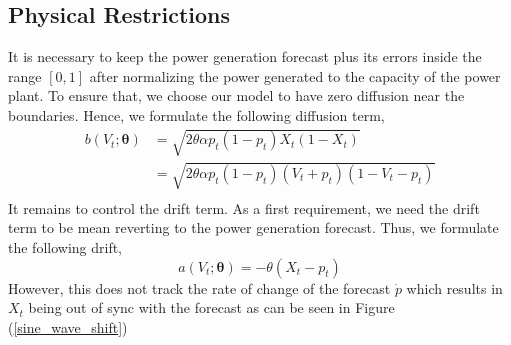 \documentclass[10pt,twocolumn,letterpaper]{article}
\begin{document}
%
%
%
%


\subsection{Physical Restrictions}
It is necessary to keep  the power generation forecast plus its errors  inside the range $[0,1]$ after normalizing the power generated to the capacity of the power plant.  To ensure that, we choose our model to have zero diffusion near the boundaries. Hence, we  formulate the following diffusion  term, 
\begin{equation*}
\begin{split}
b(V_t; \bm{\theta}) &=  \sqrt{2 \theta \alpha p_t(1-p_t) X_t (1-X_t)}    \\
&= \sqrt{2 \theta \alpha p_t(1-p_t) (V_t +p_t ) (1-V_t-p_t)}  \\
\end{split}
\end{equation*}
It remains to control the drift term. As a first requirement, we need the drift term to be mean reverting to the power generation forecast. Thus, we formulate the following drift, 
\begin{equation}
a(V_t; \bm{\theta}) =  - \theta (X_t - p_t)
\end{equation}
However, this does not track the rate of change of the forecast $\dot{p}$ which  results in $X_t$ being out of sync with the forecast  as can be seen in Figure (\ref{sine_wave_shift})
\end{document}
